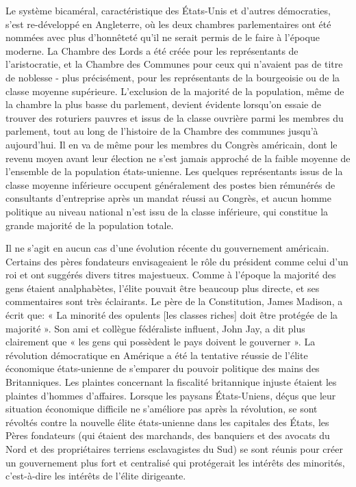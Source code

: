 Le système bicaméral, caractéristique des États-Unis et d'autres démocraties, s'est re-développé en Angleterre, où les deux chambres parlementaires ont été nommées avec plus d'honnêteté qu'il ne serait permis de le faire à l'époque moderne. La Chambre des Lords a été créée pour les représentants de l'aristocratie, et la Chambre des Communes pour ceux qui n'avaient pas de titre de noblesse - plus précisément, pour les représentants de la bourgeoisie ou de la classe moyenne supérieure. L'exclusion de la majorité de la population, même de la chambre la plus basse du parlement, devient évidente lorsqu'on essaie de trouver des roturiers pauvres et issus de la classe ouvrière parmi les membres du parlement, tout au long de l'histoire de la Chambre des communes jusqu'à aujourd'hui. Il en va de même pour les membres du Congrès américain, dont le revenu moyen avant leur élection ne s'est jamais approché de la faible moyenne de l'ensemble de la population états-unienne. Les quelques représentants issus de la classe moyenne inférieure occupent généralement des postes bien rémunérés de consultants d'entreprise après un mandat réussi au Congrès, et aucun homme politique au niveau national n'est issu de la classe inférieure, qui constitue la grande majorité de la population totale.

Il ne s'agit en aucun cas d'une évolution récente du gouvernement américain. Certains des pères fondateurs envisageaient le rôle du président comme celui d'un roi et ont suggérés divers titres majestueux. Comme à l'époque la majorité des gens étaient analphabètes, l'élite pouvait être beaucoup plus directe, et ses commentaires sont très éclairants. Le père de la Constitution, James Madison, a écrit que: « La minorité des opulents {[}les classes riches{]} doit être protégée de la majorité ». Son ami et collègue fédéraliste influent, John Jay, a dit plus clairement que « les gens qui possèdent le pays doivent le gouverner ». La révolution démocratique en Amérique a été la tentative réussie de l'élite économique états-unienne de s'emparer du pouvoir politique des mains des Britanniques. Les plaintes concernant la fiscalité britannique injuste étaient les plaintes d'hommes d'affaires. Lorsque les paysans États-Uniens, déçus que leur situation économique difficile ne s'améliore pas après la révolution, se sont révoltés contre la nouvelle élite états-unienne dans les capitales des États, les Pères fondateurs (qui étaient des marchands, des banquiers et des avocats du Nord et des propriétaires terriens esclavagistes du Sud) se sont réunis pour créer un gouvernement plus fort et centralisé qui protégerait les intérêts des minorités, c'est-à-dire les intérêts de l'élite dirigeante.

